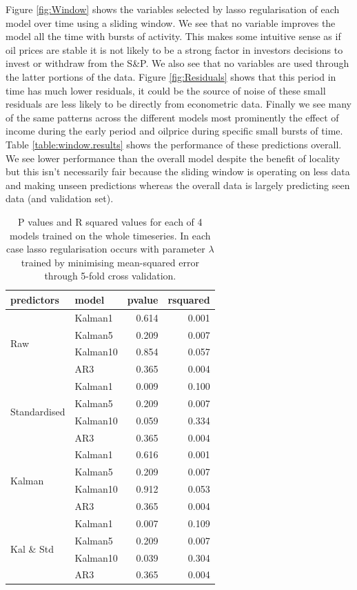 \documentclass{sig-alternate-05-2015}
\begin{document}
Figure \ref{fig:Window} shows the variables selected by lasso regularisation of each model over time using a sliding window. We see that no variable improves the model all the time with bursts of activity. This makes some intuitive sense as if oil prices are stable it is not likely  to be a strong factor in investors decisions to invest or withdraw from the S\&P. 
We also see that no variables are used through the latter portions of the data. Figure \ref{fig:Residuals} shows that this period in time has much lower residuals, it could be the source of noise of these small residuals are less likely to be directly from econometric data. 
Finally we see many of the same patterns across the different models most prominently the effect of income during the early period and oilprice during specific small bursts of time. 
Table \ref{table:window.results} shows the performance of these predictions overall. We see lower performance than the overall model despite the benefit of locality but this isn't necessarily fair because the sliding window is operating on less data and making unseen predictions whereas the overall data is largely predicting seen data (and validation set). 
\begin{table}[ht]
\centering
\begin{tabular}{llrr}
  \hline
 \textbf{predictors} & \textbf{model} & \textbf{pvalue} & \textbf{rsquared} \\ 
  \hline
  \hline
\multirow{4}{*}{Raw} & Kalman1 & 0.614 & 0.001 \\ 
& Kalman5 & 0.209 & 0.007 \\ 
& Kalman10 & 0.854 & 0.057 \\ 
& AR3 & 0.365 & 0.004 \\ 
  \hline
\multirow{4}{*}{Standardised} & Kalman1 & 0.009 & 0.100 \\ 
& Kalman5 & 0.209 & 0.007 \\ 
& Kalman10 & 0.059 & 0.334 \\ 
& AR3 & 0.365 & 0.004 \\ 
  \hline
\multirow{4}{*}{Kalman} & Kalman1 & 0.616 & 0.001 \\ 
& Kalman5 & 0.209 & 0.007 \\ 
& Kalman10 & 0.912 & 0.053 \\ 
& AR3 & 0.365 & 0.004 \\ 
  \hline
\multirow{4}{*}{Kal \& Std} & Kalman1 & 0.007 & 0.109 \\ 
& Kalman5 & 0.209 & 0.007 \\ 
& Kalman10 & 0.039 & 0.304 \\ 
& AR3 & 0.365 & 0.004 \\ 
   \hline
\end{tabular}
\caption{P values and R squared values for each of 4 models trained on the whole timeseries. In each case lasso regularisation occurs with parameter $\lambda$ trained by minimising mean-squared error through 5-fold cross validation. }
\label{table:fengineering}
\end{table}
\end{document}
